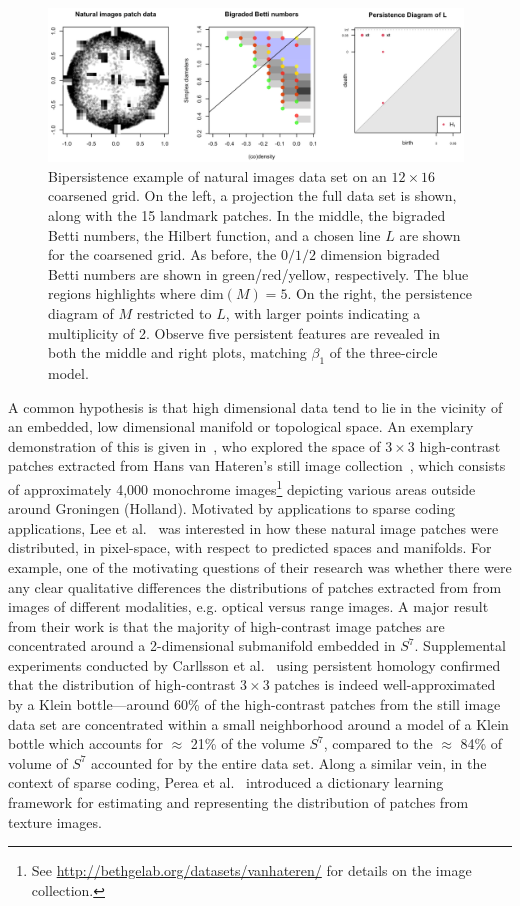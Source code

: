 \documentclass{article} %
\begin{document}
 \begin{figure}[t]
	\includegraphics[width=0.98\textwidth]{natural_images}
	\caption{Bipersistence example of natural images data set on an $12 \times 16$ coarsened grid. On the left, a projection the full data set is shown, along with the 15 landmark patches. In the middle, the bigraded Betti numbers, the Hilbert function, and a chosen line $L$ are shown for the coarsened grid. As before, the $0/1/2$ dimension bigraded Betti numbers are shown in green/red/yellow, respectively. The blue regions highlights where $\mathrm{dim}(M) = 5$. On the right, the persistence diagram of $M$ restricted to $L$, with larger points indicating a multiplicity of 2. Observe five persistent features are revealed in both the middle and right plots, matching $\beta_1$ of the three-circle model. }
	\label{fig:patch_data_dgm}
\end{figure}

A common hypothesis is that high dimensional data tend to lie in the vicinity of an embedded, low dimensional manifold or topological space. An exemplary demonstration of this is given in~\cite{lee2003nonlinear}, who explored the space of $3 \times 3$ high-contrast patches extracted from Hans van Hateren's still image collection~\cite{hateren_schaaf_1998}, which consists of approximately 4,000 monochrome images\footnote{See \url{http://bethgelab.org/datasets/vanhateren/} for details on the image collection.} depicting various areas outside around Groningen (Holland). Motivated by applications to sparse coding applications, Lee et al.~\cite{lee2003nonlinear} was interested in how these natural image patches were distributed, in pixel-space, with respect to predicted spaces and manifolds. For example, one of the motivating questions of their research was whether there were any clear qualitative differences the distributions of patches extracted from from images of different modalities, e.g. optical versus range images. A major result from their work is that the majority of high-contrast image patches are concentrated around a 2-dimensional submanifold embedded in $S^7$.
Supplemental experiments conducted by Carllsson et al.~\cite{carlsson2008local} using persistent homology confirmed that the distribution of high-contrast $3 \times 3$ patches is indeed well-approximated by a Klein bottle---around 60\% of the high-contrast patches from the still image data set are concentrated within a small neighborhood around a model of a Klein bottle which accounts for $\approx$ 21\% of the volume $S^7$, compared to the $\approx$ 84\% of volume of $S^7$ accounted for by the entire data set. Along a similar vein, in the context of sparse coding, Perea et al.~\cite{perea2014klein} introduced a dictionary learning framework for estimating and representing the distribution of patches from texture images. 
\end{document}
